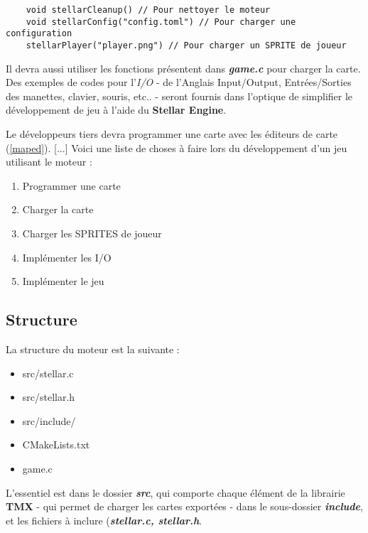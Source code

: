 \documentclass{article}
\numberwithin{equation}{section}    %
\begin{document}
    \begin{lstlisting}
    void stellarCleanup() // Pour nettoyer le moteur
    void stellarConfig("config.toml") // Pour charger une configuration
    stellarPlayer("player.png") // Pour charger un SPRITE de joueur
    \end{lstlisting}

    

    Il devra aussi utiliser les fonctions présentent dans \textit{\textbf{game.c}} pour charger la carte. Des exemples de codes pour l'\textit{I/O} - de l'Anglais Input/Output, Entrées/Sorties des manettes, clavier, souris, etc.. -  seront fournis dans l'optique de simplifier le développement de jeu à l'aide du \textbf{Stellar Engine}.\vspace{0.5cm}


    Le développeurs tiers devra programmer une carte avec les éditeurs de carte (\ref{maped}). [...] Voici une liste de choses à faire lors du développement d'un jeu utilisant le moteur : \vspace{0.5cm}

    \begin{enumerate}
        \item Programmer une carte
        \item Charger la carte
        \item Charger les SPRITES de joueur
        \item Implémenter les I/O
        \item Implémenter le jeu
    \end{enumerate}

    \subsection{Structure}
    La structure du moteur est la suivante : \vspace{0.5cm}

    \begin{itemize}
        \item src/stellar.c
        \item src/stellar.h
        \item src/include/
        \item CMakeLists.txt
        \item game.c
    \end{itemize} \vspace{0.5cm}

    L'essentiel est dans le dossier \textbf{\textit{src}}, qui comporte chaque élément de la librairie \textbf{TMX} - qui permet de charger les cartes exportées - dans le sous-dossier \textbf{\textit{include}}, et les fichiers à inclure (\textbf{\textit{stellar.c, stellar.h}}.
\end{document}
